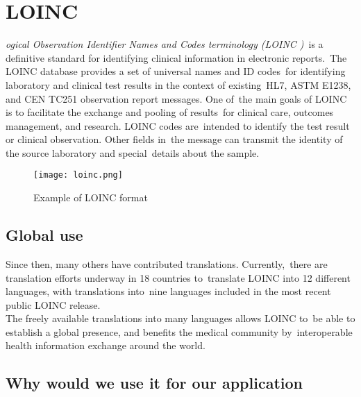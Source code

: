   \section[Logical Observation Identifier Names and Codes terminology\\
  (LOINC\textsuperscript{\textregistered})] 
  {LOINC\textsuperscript{\textregistered}}
  \label{sec:loinc}
  
  \textit{ogical Observation Identifier Names and Codes terminology (LOINC )}\
 is a definitive standard for identifying clinical information in electronic reports.\
The LOINC database provides a set of universal names and ID codes\ 
for identifying laboratory and clinical test results in the context of existing\
 HL7, ASTM E1238, and CEN TC251 observation report messages. One of\
 the main goals of LOINC is to facilitate the exchange and pooling of results\
 for clinical care, outcomes management, and research. LOINC codes are\
 intended to identify the test result or clinical observation. Other fields in\
 the message can transmit the identity of the source laboratory and special\
details about the sample.\citep{_Vreeman_2013}\

 \begin{figure}[ht!]
    \centering
    \texttt{[image: loinc.png]}
    \caption{Example of LOINC format\citep{_loinc_manual_2013}}
    \label{fig:loinc}
  \end{figure}  

\subsection{Global use}

Since then, many others have contributed translations. Currently,\
there are translation efforts underway in 18 countries to\
translate LOINC into 12 different languages, with translations into\
nine languages included in the most recent public LOINC release.\\

\noindent The freely available translations into many languages allows LOINC to\
be able to establish a global presence, and benefits the medical community by\
interoperable health information exchange around the world.\citep{vreeman_enabling_2012}\

 \subsection{Why would we use it for our application}

